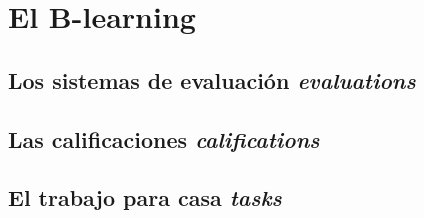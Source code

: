 \chapter{El B-learning}

\section{Los sistemas de evaluación \emph{evaluations}}
\section{Las calificaciones \emph{califications}}
\section{El trabajo para casa \emph{tasks}}
